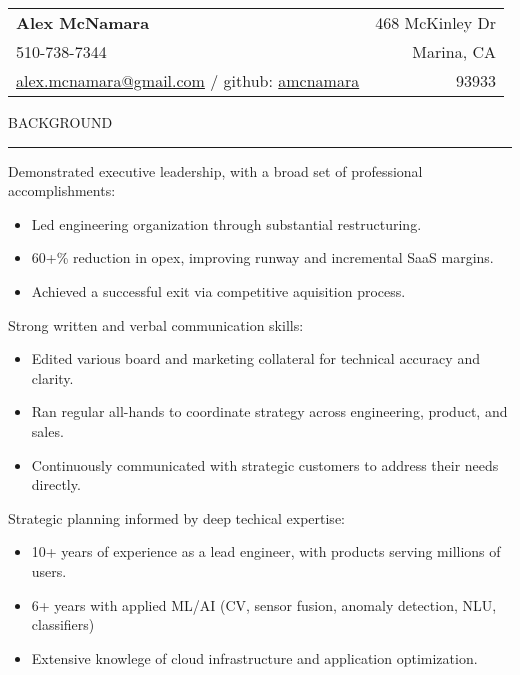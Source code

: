 \documentclass[12pt]{article}
\makeatletter
\newenvironment{justifycolumns}
{\begin{tabular*}{\textwidth}{@{\extracolsep{\fill}} lr@{}}}
{\end{tabular*}}
\newcommand{\row}[2]{#1 & #2 \\}
\newcommand{\blockseparation}{\vspace{0.13in}}
\newcommand{\heading}[1]{
	\vspace{0.05in}
	\uppercase{#1}
	\vspace{0.05in}
	\hrule
	\blockseparation
}
\newcommand{\bulletheading}[1]{
	\vspace{0.075in}
	\hspace{0.1in}
	{#1}
	\vspace{0.03in}
}
\newenvironment{tightbullets}
{\begin{itemize}}
{\end{itemize}}
\makeatother
\begin{document}
\begin{flushleft}

\begin{justifycolumns}
	\row{\Large\textbf{Alex McNamara}}{468 McKinley Dr}
	\row{510-738-7344}{Marina, CA}
	\row{
		\href{mailto:alex.mcnamara@gmail.com}{alex.mcnamara@gmail.com} / github: 
		\href{http://www.github.com/amcnamara}{amcnamara}
	}{93933}
\end{justifycolumns}
\vspace{0.175in}

\heading{Background}
\bulletheading{Demonstrated executive leadership, with a broad set of professional accomplishments:}
\begin{tightbullets}
	\item Led engineering organization through substantial restructuring.
	\item 60+\% reduction in opex, improving runway and incremental SaaS margins.
	\item Achieved a successful exit via competitive aquisition process.
\end{tightbullets}

\bulletheading{Strong written and verbal communication skills:}
\begin{tightbullets}
	\item Edited various board and marketing collateral for technical accuracy and clarity.
	\item Ran regular all-hands to coordinate strategy across engineering, product, and sales.
	\item Continuously communicated with strategic customers to address their needs directly.
\end{tightbullets}

\bulletheading{Strategic planning informed by deep techical expertise:}
\begin{tightbullets}
	\item 10+ years of experience as a lead engineer, with products serving millions of users.
	\item 6+ years with applied ML/AI (CV, sensor fusion, anomaly detection, NLU, classifiers)
	\item Extensive knowlege of cloud infrastructure and application optimization.
\end{tightbullets}

\blockseparation


\end{flushleft}
\end{document}
